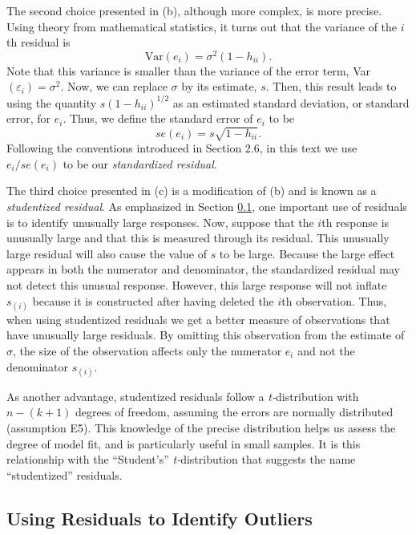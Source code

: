 The second choice presented in (b), although more complex, is more
precise. Using theory from mathematical statistics, it turns out
that the variance of the $i$th residual is
\begin{equation*}
\mathrm{Var}(e_i)=\sigma ^{2}(1-h_{ii}).
\end{equation*}
Note that this variance is smaller than the variance of the error
term, Var $(\varepsilon_i)=\sigma ^{2}$. Now, we can replace $\sigma
$ by its estimate, $s$. Then, this result leads to using the
quantity $s(1-h_{ii})^{1/2}$ as an estimated standard deviation, or
standard error, for $e_i$. Thus, we define the standard error of
$e_i$ to be
\begin{equation*}
se(e_i)=s \sqrt{1-h_{ii}}.
\end{equation*}
Following the conventions introduced in Section 2.6, in this text we use $%
e_i/se(e_i)$ to be our \textit{standardized residual}.

The third choice presented in (c) is a modification of (b) and is
known as a \textit{studentized residual}. As emphasized in Section
\ref{S5:ResidualsOutliers}, one important use of residuals is to
identify unusually large responses. Now, suppose that the $i$th
response is unusually large and that this is measured through its
residual. This unusually large residual will also cause the value of
$s$ to be large. Because the large effect appears in both the
numerator and denominator, the standardized residual may not detect
this unusual response. However, this large response will not inflate
$s_{(i)}$ because it is constructed after having deleted the $i$th
observation. Thus, when using studentized residuals we get a better
measure of observations that have unusually large residuals. By
omitting this observation from the estimate of $\sigma $, the size
of the observation affects only the numerator $e_i$ and not the
denominator $s_{(i)}$.

As another advantage, studentized residuals follow a
\textit{t-}distribution with $n-(k+1)$ degrees of freedom, assuming
the errors are normally distributed (assumption E5). This knowledge
of the precise distribution helps us assess the degree of model fit,
and is particularly useful in small samples. It is this relationship
with the ``Student's'' \textit{t-}distribution that suggests the
name ``studentized'' residuals.

\subsection{Using Residuals to Identify
Outliers}\label{S5:ResidualsOutliers}

